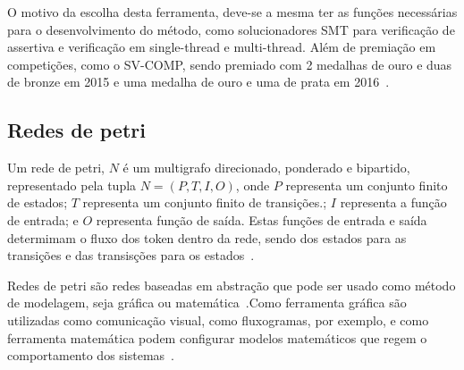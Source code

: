 
\par
O motivo da escolha desta ferramenta, deve-se a mesma ter as funções necessárias para o desenvolvimento do método, como solucionadores SMT para verificação de assertiva e verificação em single-thread e multi-thread. Além de premiação em competições, como o SV-COMP, sendo premiado com 2 medalhas de ouro e duas de bronze em 2015 e uma medalha de ouro e uma de prata em 2016~\cite{esbmc}.
\subsection{Redes de petri}
\par
Um rede de petri, $N$ é um multigrafo direcionado, ponderado e bipartido, representado pela tupla $N=(P,T,I,O)$, onde $P$ representa um conjunto finito de estados; $T$ representa um conjunto finito de transições.; $I$ representa a função de entrada; e $O$ representa função de saída. Estas funções de entrada e saída determimam o fluxo dos token dentro da rede, sendo dos estados para as transições e das transisções para os estados~\cite{halder2006}.


Redes de petri são redes baseadas em abstração que pode ser usado como método de modelagem, seja gráfica ou matemática~\cite{halder2006}.Como ferramenta gráfica são utilizadas como comunicação visual, como fluxogramas, por exemplo, e como ferramenta matemática podem configurar modelos matemáticos que regem o comportamento dos sistemas~\cite{murata1989petri}. 

